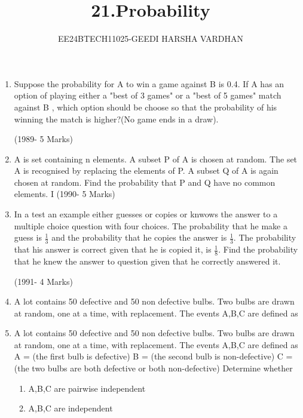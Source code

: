 \documentclass[journal,12pt,twocolumn]{IEEEtran}
\theoremstyle{remark}
\begin{document}

\vspace{3cm}

\title{21.Probability}
\author{EE24BTECH11025-GEEDI HARSHA VARDHAN}
\maketitle
\newpage
\bigskip

\renewcommand{\thefigure}{\theenumi}
\renewcommand{\thetable}{\theenumi}




\begin{enumerate}
\item Suppose the probability for A to win a game against B is 0.4. If A has an option of playing either a "best of 3 games" or a "best of 5 games" match against B , which option should be choose so that the probability of his winning the match is higher?(No game ends in a draw).

\hfill(1989- 5 Marks)

\item A is set containing n elements. A subset P of A is chosen at random. The set A is recognised by replacing the elements of P. A subset Q of A is again chosen at random. Find the probability that P and Q have no common elements.
I
\hfill(1990- 5 Marks)




\item In a test an example either guesses or copies or knwows the answer to a multiple choice question with four choices. The probability that he make a guess is $\frac{1}{3}$ and the probability that he copies the answer is $\frac{1}{3}$. The probability that his answer is correct given that he is copied it, is $\frac{1}{8}$. Find the probability that he knew the answer to question given that he correctly answered it.

\hfill(1991- 4 Marks)

\item A lot contains 50 defective and 50 non defective bulbs. Two bulbs are drawn at random, one at a time, with replacement. The events A,B,C are defined as 


\item A lot contains 50 defective and 50 non defective bulbs. Two bulbs are drawn at random, one at a time, with replacement. The events A,B,C are defined as 
A = (the first bulb is defective)
B = (the second bulb is non-defective)
C = (the two bulbs are both defective or both non-defective)
Determine whether
\begin{enumerate}[label=(\roman*)]
\item A,B,C are pairwise independent
\item A,B,C are independent
\end{enumerate}


\end{enumerate}
\end{document}
